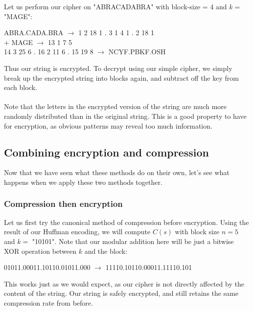 \documentclass[11pt]{article}
\begin{document}
Let us perform our cipher on "ABRACADABRA" with block-size = 4 and $k=$ "MAGE":
\begin{center}
	ABRA.CADA.BRA $\rightarrow$ 1 2 18 1 . 3 1 4 1 . 2 18 1\\
	$+$ MAGE $\rightarrow$ 13 1 7 5\\
	14 3 25 6 . 16 2 11 6 . 15 19 8 $\rightarrow$ NCYF.PBKF.OSH\\
\end{center}
Thus our string is encrypted. To decrypt using our simple cipher, we simply break up the encrypted string into 
blocks again, and subtract off the key from each block.\\\\
Note that the letters in the encrypted version of the string are much more randomly distributed than in the 
original string. This is a good property to have for encryption, as obvious patterns may reveal too much 
information. 

\subsection{Combining encryption and compression}\label{encrypt-plus-compress-subsect}
Now that we have seen what these methods do on their own, let's see what happens when we apply these two methods together. 

\subsubsection{Compression then encryption}\label{e-then-c-subsubsect}
Let us first try the canonical method of compression before encryption. Using the result of our Huffman encoding, we will compute 
$C(s)$ with block size $n=5$ and $k=$ "10101". Note that our modular addition here will be just a bitwise XOR operation between 
$k$ and the block:
\begin{center}
	01011.00011.10110.01011.000 $\rightarrow$ 11110.10110.00011.11110.101\\
\end{center}
This works just as we would expect, as our cipher is not directly affected by the content of the string. Our string is 
safely encrypted, and still retains the same compression rate from before.
\end{document}
